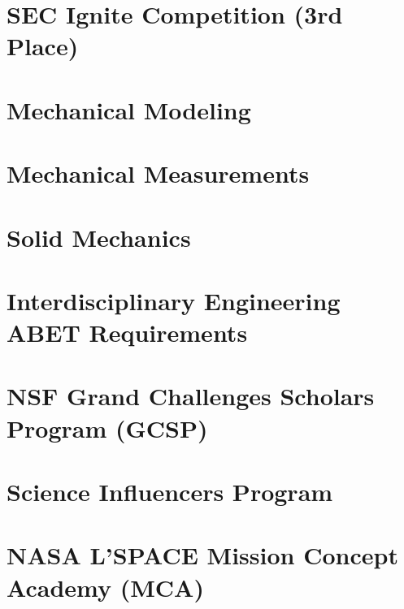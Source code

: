 \documentclass[a4paper,12pt]{article}
\begin{document}
\section{SEC Ignite Competition (3rd Place)}


\section{Mechanical Modeling}


\section{Mechanical Measurements}


\section{Solid Mechanics}



\section{Interdisciplinary Engineering ABET Requirements}




\section{NSF Grand Challenges Scholars Program (GCSP)}




\section{Science Influencers Program}


\section{NASA L'SPACE Mission Concept Academy (MCA)}


\end{document}
